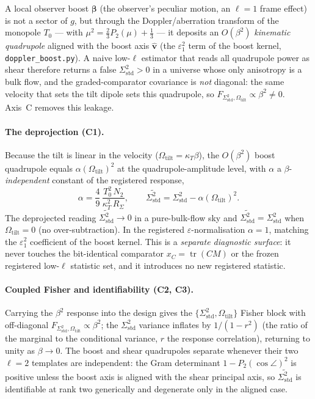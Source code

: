 \documentclass[11pt,a4paper]{article}
\newcommand{\xC}{x_{C}}
\newcommand{\Sigstd}{\Sigma^{2}_{\mathrm{std}}}
\newcommand{\Otilt}{\Omega_{\mathrm{tilt}}}
\theoremstyle{plain}
\theoremstyle{definition}
\begin{document}
A local observer boost $\boldsymbol\beta$ (the observer's peculiar motion, an
$\ell=1$ frame effect) is not a sector of $g$, but through the Doppler/aberration
transform of the monopole $T_0$ --- with $\mu^2=\tfrac23P_2(\mu)+\tfrac13$ --- it
deposits an $O(\beta^2)$ \emph{kinematic quadrupole} aligned with the boost axis
$\hat{\mathbf v}$ (the $\varepsilon_1^2$ term of the boost kernel,
\texttt{doppler\_boost.py}). A naive low-$\ell$ estimator that reads all quadrupole
power as shear therefore returns a false $\Sigstd>0$ in a universe whose only
anisotropy is a bulk flow, and the graded-comparator covariance is \emph{not}
diagonal: the same velocity that sets the tilt dipole sets this quadrupole, so
$F_{\Sigstd,\Otilt}\propto\beta^2\neq0$. Axis~C removes this leakage.

\paragraph{The deprojection (C1).}
Because the tilt is linear in the velocity ($\Otilt=\kappa_T\beta$), the
$O(\beta^2)$ boost quadrupole equals $\alpha(\Otilt)^2$ at the quadrupole-amplitude
level, with $\alpha$ a $\beta$-\emph{independent} constant of the registered
response,
\begin{equation}
  \alpha=\frac{4}{9}\,\frac{T_0^2\,N_2}{\kappa_T^2\,R_\Sigma},
  \qquad
  \widetilde{\Sigstd}=\Sigstd-\alpha(\Otilt)^2 .
\end{equation}
The deprojected reading $\widetilde{\Sigstd}\to0$ in a pure-bulk-flow sky and
$\widetilde{\Sigstd}=\Sigstd$ when $\Otilt=0$ (no over-subtraction). In the
registered $\varepsilon$-normalisation $\alpha=1$, matching the
$\varepsilon_1^2$ coefficient of the boost kernel. This is a \emph{separate
diagnostic surface}: it never touches the bit-identical comparator
$\xC=\operatorname{tr}(CM)$ or the frozen registered low-$\ell$ statistic set, and
it introduces no new registered statistic.

\paragraph{Coupled Fisher and identifiability (C2, C3).}
Carrying the $\beta^2$ response into the design gives the
$\{\Sigstd,\Otilt\}$ Fisher block with off-diagonal $F_{\Sigstd,\Otilt}\propto\beta^2$;
the $\Sigstd$ variance inflates by $1/(1-r^2)$ (the ratio of the marginal to the
conditional variance, $r$ the response correlation), returning to unity as
$\beta\to0$. The boost and shear quadrupoles separate whenever their two $\ell=2$
templates are independent: the Gram determinant $1-P_2(\cos\angle)^2$ is positive
unless the boost axis is aligned with the shear principal axis, so
$\widetilde{\Sigstd}$ is identifiable at rank two generically and degenerate only
in the aligned case.
\end{document}
